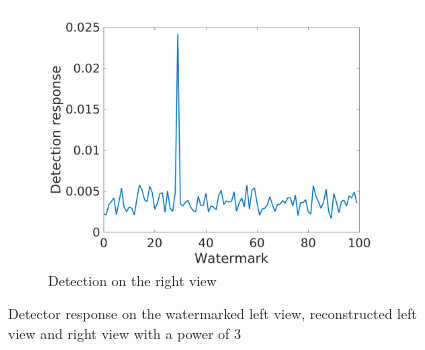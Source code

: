 \begin{figure}[h!]
\begin{subfigure}[t]{0.5\textwidth}
\includegraphics[width=1\textwidth]{./img/corr_gauss/right_warped_corr_value_3.png}
   \caption{\small{Detection on the right view}\label{fig:gr3}}
\end{subfigure}
\caption{Detector response on the watermarked left view, reconstructed left view and right view with a power of 3\label{fig:gauss3}}
\end{figure}

